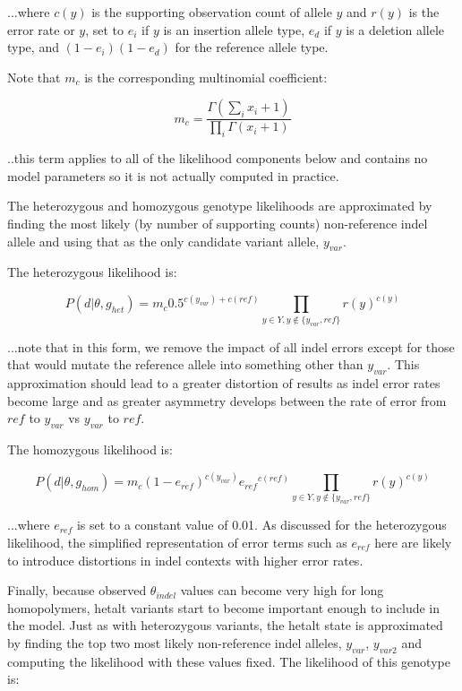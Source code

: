 \documentclass{article}
\begin{document}
...where $c(y)$ is the supporting observation count of allele $y$ and $r(y)$ is the error rate or $y$, set to $e_i$ if $y$ is an insertion allele type, $e_d$ if $y$ is a deletion allele type, and $(1-e_i) (1-e_d)$ for the reference allele type.

Note that $m_c$ is the corresponding multinomial coefficient:

\begin{equation*}
m_c = \frac{\Gamma(\sum_{i}{x_i + 1})}{\prod_{i}{\Gamma(x_i+1)}}
\end{equation*}

..this term applies to all of the likelihood components below and contains no model parameters so it is not actually computed in practice.

The heterozygous and homozygous genotype likelihoods are approximated by finding the most likely (by number of supporting counts) non-reference indel allele and using that as the only candidate variant allele, $y_{var}$.

The heterozygous likelihood is:

\begin{equation*}
P (d \vert \theta, g_{het}) = m_c 0.5^{c(y_{var}) + c(ref)} \prod_{y \in Y, y \not\in \{y_{var},ref\}} r(y)^{c(y)}
\end{equation*}

...note that in this form, we remove the impact of all indel errors except for those that would mutate the reference allele into something other than $y_{var}$. This approximation should lead to a greater distortion of results as indel error rates become large and as greater asymmetry develops between the rate of error from $ref$ to $y_{var}$ vs $y_{var}$ to $ref$.

The homozygous likelihood is:

\begin{equation*}
P (d \vert \theta, g_{hom}) = m_c (1-e_{ref})^{c(y_{var})} {e_{ref}}^{c(ref)} \prod_{y \in Y, y \not\in \{y_{var},ref\}} r(y)^{c(y)}
\end{equation*}

...where $e_{ref}$ is set to a constant value of 0.01. As discussed for the heterozygous likelihood, the simplified representation of error terms such as $e_{ref}$ here are likely to introduce distortions in indel contexts with higher error rates.

Finally, because observed $\theta_{indel}$ values can become very high for long homopolymers, hetalt variants start to become important enough to include in the model. Just as with heterozygous variants, the hetalt state is approximated by finding the top two most likely non-reference indel alleles, $y_{var}$, $y_{var2}$ and computing the likelihood with these values fixed. The likelihood of this genotype is:
\end{document}
